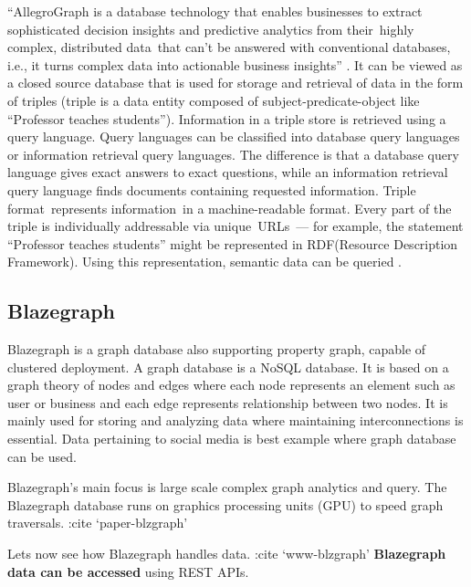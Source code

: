 {     ``AllegroGraph is a database technology that enables businesses to
     extract sophisticated decision insights and predictive analytics
     from their highly complex, distributed data that can’t be
     answered with conventional databases, i.e., it turns complex data
     into actionable business insights'' \cite{www-Allegro}. It can be
     viewed as a closed source database that is used for storage and
     retrieval of data in the form of triples (triple is a data entity
     composed of subject-predicate-object like ``Professor teaches
     students'').  Information in a triple store is retrieved using a
     query language. Query languages can be classified into database
     query languages or information retrieval query languages. The
     difference is that a database query language gives exact answers
     to exact questions, while an information retrieval query language
     finds documents containing requested information.  Triple
     format represents information in a machine-readable format.
     Every part of the triple is individually addressable via
     unique URLs — for example, the statement ``Professor teaches
     students'' might be represented in RDF(Resource Description
     Framework). Using this representation, semantic data
     can be queried  \cite{www-Allegrow}.

     \pv

\subsection{Blazegraph}

     Blazegraph is a graph database also supporting property graph, 
     capable of clustered deployment. A graph database is a NoSQL 
     database. It is based on a graph theory of nodes and edges where 
     each node represents an element such as user or business and each 
     edge represents relationship between two nodes. It is mainly used 
     for storing and analyzing data where maintaining interconnections 
     is essential. Data pertaining to social media is best example where 
     graph database can be used.

     Blazegraph’s main focus is large scale complex graph analytics and query. 
     The Blazegraph database runs on graphics processing units (GPU) to 
     speed graph traversals. :cite ‘paper-blzgraph’

     Lets now see how Blazegraph handles data. :cite ‘www-blzgraph’ 
     {\bf Blazegraph data can be accessed} using REST APIs. 

}

